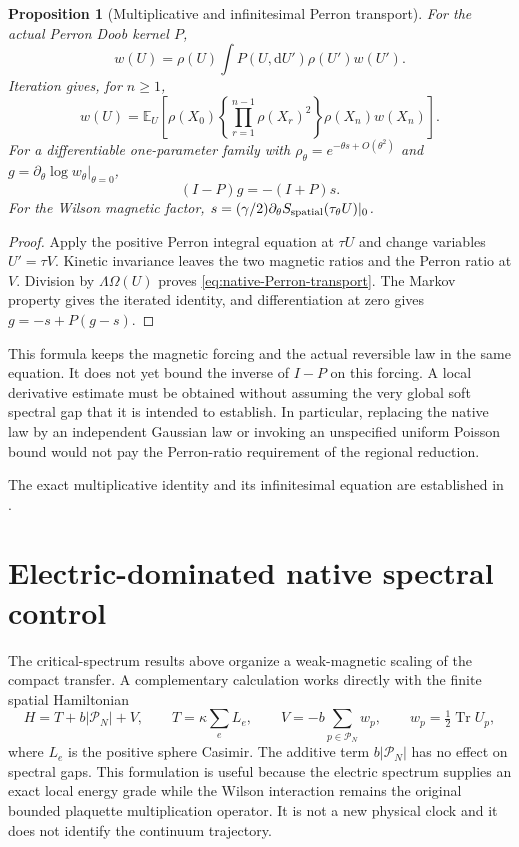 \documentclass[11pt,oneside,openany]{book}
\newtheorem{proposition}[proposition]{Proposition}
\theoremstyle{definition}
\theoremstyle{remark}
\newcommand{\dd}{\mathrm d}
\newcommand{\Tr}{\operatorname{Tr}}
\newcommand{\src}[2]{\cite[#2]{#1}}
\newcommand{\sourcebasis}[1]{\par\smallskip\noindent #1\par}
\begin{document}
\begin{proposition}[Multiplicative and infinitesimal Perron transport]
\label{prop:native-Perron-transport}
For the actual Perron Doob kernel $P$,
\begin{equation}
 w(U)=\rho(U)\int P(U,\dd U')\rho(U')w(U').
 \label{eq:native-Perron-transport}
\end{equation}
Iteration gives, for $n\ge1$,
\begin{equation}
 w(U)=\mathbb E_U\left[
  \rho(X_0)\left\{\prod_{r=1}^{n-1}\rho(X_r)^2\right\}
  \rho(X_n)w(X_n)\right].
 \label{eq:native-Perron-path-transport}
\end{equation}
For a differentiable one-parameter family with
$\rho_\theta=e^{-\theta s+O(\theta^2)}$ and
$g=\left.\partial_\theta\log w_\theta\right|_{\theta=0}$,
\begin{equation}
 (I-P)g=-(I+P)s.
 \label{eq:native-Perron-Poisson}
\end{equation}
For the Wilson magnetic factor,
$s=(\gamma/2)\partial_\theta S_{\rm spatial}(\tau_\theta U)|_0$.
\end{proposition}
\begin{proof}
Apply the positive Perron integral equation at $\tau U$ and change
variables $U'=\tau V$. Kinetic invariance leaves the two magnetic
ratios and the Perron ratio at $V$. Division by
$\Lambda\Omega(U)$ proves \cref{eq:native-Perron-transport}.
The Markov property gives the iterated identity, and differentiation
at zero gives $g=-s+P(g-s)$.
\end{proof}

This formula keeps the magnetic forcing and the actual reversible law
in the same equation. It does not yet bound the inverse of $I-P$ on
this forcing. A local derivative estimate must be obtained without
assuming the very global soft spectral gap that it is intended to
establish. In particular, replacing the native law by an independent
Gaussian law or invoking an unspecified uniform Poisson bound would
not pay the Perron-ratio requirement of the regional reduction.
\sourcebasis{The exact multiplicative identity and its
infinitesimal equation are established in \src{F16}{V65}.}



\section{Electric-dominated native spectral control}
\label{sec:native-electric-control}
The critical-spectrum results above organize a weak-magnetic scaling of
the compact transfer.  A complementary calculation works directly with
the finite spatial Hamiltonian
\begin{equation}\label{eq:native-electric-H}
 H=T+b|\mathcal P_N|+V,\qquad
 T=\kappa\sum_e L_e,\qquad
 V=-b\sum_{p\in\mathcal P_N}w_p,
 \qquad w_p=\tfrac12\Tr U_p,
\end{equation}
where $L_e$ is the positive sphere Casimir.  The additive term
$b|\mathcal P_N|$ has no effect on spectral gaps.  This formulation is
useful because the electric spectrum supplies an exact local energy
grade while the Wilson interaction remains the original bounded
plaquette multiplication operator.  It is not a new physical clock and
it does not identify the continuum trajectory.
\end{document}
